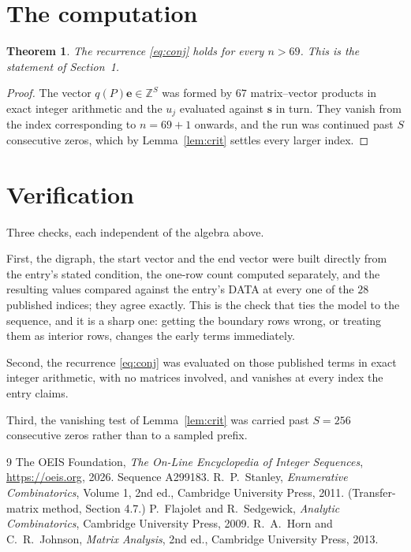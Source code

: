 \documentclass[11pt,a4paper]{article}
\theoremstyle{plain}
\newtheorem{theorem}{Theorem}
\theoremstyle{definition}
\begin{document}
\section{The computation}

\begin{theorem}
The recurrence \eqref{eq:conj} holds for every $n>69$. This is the statement of
Section~1.
\end{theorem}

\begin{proof}
The vector $q(P)\mathbf{e}\in\mathbb{Z}^{S}$ was formed by $67$ matrix--vector
products in exact integer arithmetic and the $u_j$ evaluated against $\mathbf{s}$ in turn.
They vanish from the index corresponding to $n=69+1$ onwards, and the run was continued
past $S$ consecutive zeros, which by Lemma~\ref{lem:crit} settles every larger index.
\end{proof}

\section{Verification}

Three checks, each independent of the algebra above.

First, the digraph, the start vector and the end vector were built directly from the
entry's stated condition, the one-row count computed separately, and the resulting values
compared against the entry's DATA at every one of the $28$ published indices; they
agree exactly. This is the check that ties the model to the sequence, and it is a sharp one:
getting the boundary rows wrong, or treating them as interior rows, changes the early terms
immediately.

Second, the recurrence \eqref{eq:conj} was evaluated on those published terms in exact
integer arithmetic, with no matrices involved, and vanishes at every index the entry claims.

Third, the vanishing test of Lemma~\ref{lem:crit} was carried past $S=256$ consecutive
zeros rather than to a sampled prefix.

\begin{thebibliography}{9}
 The OEIS Foundation, \emph{The On-Line Encyclopedia of Integer
Sequences}, \url{https://oeis.org}, 2026. Sequence A299183.
 R.~P.~Stanley, \emph{Enumerative Combinatorics}, Volume 1, 2nd ed.,
Cambridge University Press, 2011. (Transfer-matrix method, Section 4.7.)
 P.~Flajolet and R.~Sedgewick, \emph{Analytic Combinatorics}, Cambridge
University Press, 2009.
 R.~A.~Horn and C.~R.~Johnson, \emph{Matrix Analysis}, 2nd ed., Cambridge
University Press, 2013.
\end{thebibliography}
\end{document}
